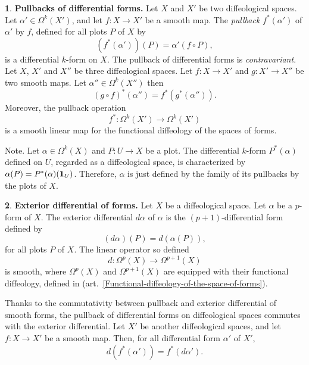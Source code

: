 \documentclass[11pt,reqno]{amsart}
\theoremstyle{definition}
\newtheorem{article}{}
\newcommand{\artlabel}[1]{{\bf #1.}}
\def \P{{P}}
\def \U{{U}}
\def \X{{X}}
\newcommand{\art}[1]{{(art.~\ref{#1})}}
\newcommand{\id}{{\bf 1}}
\begin{document}
  \begin{article}\artlabel{Pullbacks of differential forms}
    \label{Pullbacks-of-differential-forms}
    Let $\X$ and $\X'$ be two diffeological spaces.
    Let $\alpha' \in \Omega^k(\X')$, and let $f: \X \to
      \X'$ be a smooth map. The {\em pullback} $f^*(\alpha')$
    of $\alpha'$ by $f$, defined for all plots $\P$ of $\X$ by
    $$
      (f^*(\alpha'))(\P) = \alpha'(f \circ \P),
      $$
    is a differential $k$-form on $\X$. 
    The pullback of differential
    forms is {\em contravariant}. Let $\X$, $\X'$ and
    $\X''$ be three diffeological spaces. 
    Let $f: \X \to \X'$ and $g: \X' \to \X''$ be two smooth maps. 
    Let $\alpha'' \in \Omega^k(\X'')$ then
    $$
      (g \circ f )^*(\alpha'') = f^*(g^*(\alpha'')).
    $$
    Moreover, the pullback operation
    $$
      f^*: \Omega^k(\X') \to \Omega^k(\X')
      $$
    is a smooth linear map for the functional
    diffeology of the spaces of forms.
    
    {\sc Note.}  Let $\alpha \in
      \Omega^k(\X)$ and $\P: \U \to \X$ be a plot. 
    The differential $k$-form $\P^*(\alpha)$ defined on $\U$,
    regarded as a diffeological space, is
    characterized by $\alpha(\P) = \P^*(\alpha)(\id_\U)$. 
    Therefore, $\alpha$ is just defined by
    the family of its pullbacks by the plots of $\X$.
  \end{article} %
  
  \begin{article}\artlabel{Exterior differential of forms}
    \label{Exterior-differential-of-forms}
    Let $\X$ be a diffeological spa\-ce. Let $\alpha$ be a
    $p$-form of $\X$. The exterior differential $d\alpha$ of
    $\alpha$ is the $(p+1)$-differential form defined by  
    $$
      (d\alpha)(\P) = d(\alpha(\P)),
      $$ 
    for all plots $\P$ of $\X$. The linear
    operator so defined $$
      d: \Omega^p(\X) \to \Omega^{p+1}(\X)
      $$
    is smooth, where $\Omega^p(\X)$ and
    $\Omega^{p+1}(\X)$ are equipped with their functional
    diffeology, defined in
    \art{Functional-diffeology-of-the-space-of-forms}.
    
    Thanks to the commutativity between
    pullback and exterior differential of smooth forms, the
    pullback of differential forms on diffeological spaces
    commutes with the exterior differential. Let $\X'$ be
    another diffeological spaces, and let $f: \X \to \X'$ be a
    smooth map. Then, for all differential form
    $\alpha'$ of $\X'$,
    $$
      d(f^*(\alpha')) =
      f^*(d\alpha').
      $$
  \end{article} %
  
\end{document}
